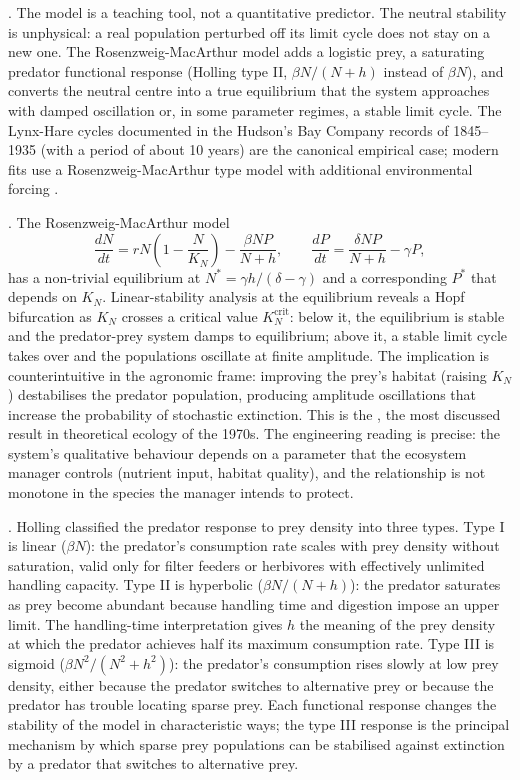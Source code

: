 . The model is a teaching tool,
not a quantitative predictor. The neutral stability is unphysical: a
real population perturbed off its limit cycle does not stay on a
new one. The Rosenzweig-MacArthur model
\cite[pp.~209--223]{paper:v6c08-rosenzweig-macarthur-1963} adds a logistic
prey, a saturating predator functional response (Holling type II,
$\beta N/(N + h)$ instead of $\beta N$), and converts the neutral
centre into a true equilibrium that the system approaches with
damped oscillation or, in some parameter regimes, a stable limit
cycle. The Lynx-Hare cycles documented in the Hudson's Bay Company
records of 1845--1935 (with a period of about 10 years) are the
canonical empirical case; modern fits use a Rosenzweig-MacArthur
type model with additional environmental forcing
\cite[ch.~5]{text:v6c08-may-stability}.

. The Rosenzweig-MacArthur model
\[
\frac{dN}{dt} = rN\left(1 - \frac{N}{K_N}\right) - \frac{\beta N P}{N + h},
\qquad
\frac{dP}{dt} = \frac{\delta N P}{N + h} - \gamma P,
\]
has a non-trivial equilibrium at $N^* = \gamma h / (\delta - \gamma)$
and a corresponding $P^*$ that depends on $K_N$. Linear-stability
analysis at the equilibrium reveals a Hopf bifurcation as $K_N$
crosses a critical value $K_N^{\mathrm{crit}}$: below it, the
equilibrium is stable and the predator-prey system damps to
equilibrium; above it, a stable limit cycle takes over and the
populations oscillate at finite amplitude. The implication is
counterintuitive in the agronomic frame: improving the prey's habitat
(raising $K_N$) destabilises the predator population, producing
amplitude oscillations that increase the probability of stochastic
extinction. This is the , the most
discussed result in theoretical ecology of the 1970s. The engineering
reading is precise: the system's qualitative behaviour depends on
a parameter that the ecosystem manager controls (nutrient input,
habitat quality), and the relationship is not monotone in the
species the manager intends to protect.

. Holling classified the predator
response to prey density into three types. Type I is linear
($\beta N$): the predator's consumption rate scales with prey
density without saturation, valid only for filter feeders or
herbivores with effectively unlimited handling capacity. Type II is
hyperbolic ($\beta N/(N + h)$): the predator saturates as prey
become abundant because handling time and digestion impose an
upper limit. The handling-time interpretation gives $h$ the meaning
of the prey density at which the predator achieves half its
maximum consumption rate. Type III is sigmoid ($\beta N^2/(N^2 +
h^2)$): the predator's consumption rises slowly at low prey density,
either because the predator switches to alternative prey or because
the predator has trouble locating sparse prey. Each functional
response changes the stability of the model in characteristic
ways; the type III response is the principal mechanism by which
sparse prey populations can be stabilised against extinction by a
predator that switches to alternative prey.

